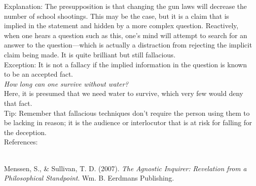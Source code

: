 \documentclass[a4paper,12pt,single,pdftex]{scrartcl}
\begin{document}
    
      Explanation: The presupposition is that changing the gun laws will decrease the number of school shootings.  This may be the case, but it is a claim that is implied in the statement and hidden by a more complex question.  Reactively, when one hears a question such as this, one's mind will attempt to search for an answer to the question—which is actually a distraction from rejecting the implicit claim being made.  It is quite brilliant but still fallacious.
    \\

    
      Exception: It is not a fallacy if the implied information in the question is known to be an accepted fact.
    \\

    
      {\em How long can one survive without water?}
    \\

    
      Here, it is presumed that we need water to survive, which very few would deny that fact.
    \\

    
      Tip: Remember that fallacious techniques don’t require the person using them to be lacking in reason; it is the audience or interlocutor that is at risk for falling for the deception.
    \\

    References:

    
      
        
      \\

      
        
          Menssen, S., \& Sullivan, T. D. (2007). {\it The Agnostic Inquirer: Revelation from a Philosophical Standpoint}. Wm. B. Eerdmans Publishing.
        
      
    
\end{document}
